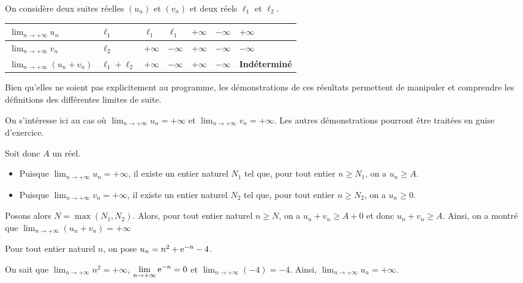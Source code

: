 \documentclass[11pt,fleqn]{book} %
\begin{document}
\begin{proposition}On considère deux suites réelles $(u_n)$ et $(v_n)$ et deux réels $\ell_1$ et $\ell_2$. 

\begin{tabularx}{\linewidth}{|l|X|X|X|X|X|X|}
\hline
$\displaystyle \lim_{n \to +\infty} u_n$ & $\ell_1$ & $\ell_1$ & $\ell_1$ & $+\infty$ & $-\infty$ & $+\infty$\\
\hline
$\displaystyle \lim_{n \to +\infty} v_n$ & $\ell_2$ & $+\infty$ & $-\infty$ & $+\infty$ & $-\infty$ & $-\infty$\\
\hline
$\displaystyle \lim_{n \to +\infty} (u_n + v_n)$ & $\ell_1+\ell_2$ & $+\infty$ & $-\infty$ & $+\infty$ & $-\infty$ & \textbf{Indéterminé} \\
\hline
\end{tabularx}\end{proposition}

\begin{demonstration}Bien qu'elles ne soient pas explicitement au programme, les démonstrations de ces résultats permettent de manipuler et comprendre les définitions des différentes limites de suite. 

On s'intéresse ici au cas où $\displaystyle\lim_{n \to + \infty}u_n=+\infty$ et $\displaystyle \lim_{n \to+\infty}v_n=+\infty$. Les autres démonstrations pourront être traitées en guise d'exercice.

Soit donc $A$ un réel.
\begin{itemize}
\item Puisque $\displaystyle\lim_{n \to + \infty}u_n=+\infty$, il existe un entier naturel $N_1$ tel que, pour tout entier $n\geqslant N_1$, on a $u_n \geqslant A$.
\item Puisque $\displaystyle\lim_{n \to + \infty}v_n=+\infty$, il existe un entier naturel $N_2$ tel que, pour tout entier $n\geqslant N_2$, on a $u_n \geqslant 0$.
\end{itemize}
Posons alors $N=\max (N_1,N_2)$. Alors, pour tout entier naturel $n \geqslant N$, on a $u_n + v_n \geqslant A + 0$ et donc $u_n+v_n\geqslant A$. Ainsi, on a montré que $\displaystyle \lim_{n \to+\infty}(u_n+v_n)=+\infty$\end{demonstration}

\begin{example}Pour tout entier naturel $n$, on pose $u_n=n^2+\mathrm{e}^{-n}-4$. 

On sait que $\displaystyle \lim_{n \to +\infty} n^2 = +\infty$,  $\displaystyle \lim_{n \to +\infty} \mathrm{e}^{-n} = 0$ et $\displaystyle \lim_{n \to +\infty} (-4)= -4$. Ainsi, $\displaystyle \lim_{n \to +\infty} u_n =+\infty$.\end{example}
\end{document}
